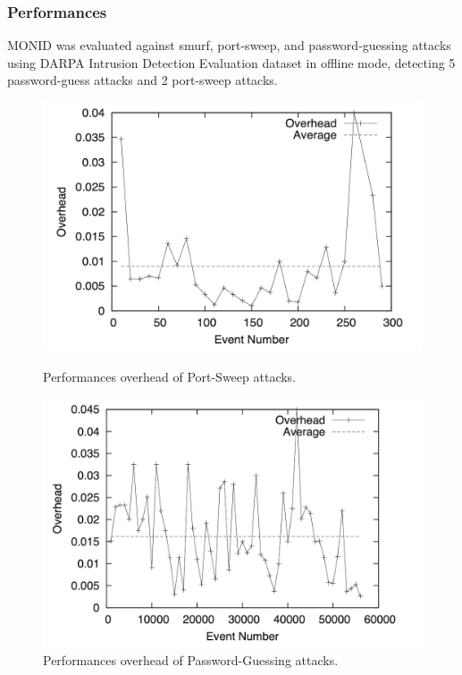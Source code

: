 \documentclass[aspectratio=169,t,xcolor=table]{beamer}
\begin{document}
\begin{frame}
    \frametitle{Performances}
    MONID was evaluated against smurf, port-sweep, and password-guessing attacks using DARPA Intrusion Detection Evaluation dataset in offline mode, detecting 5 password-guess attacks and 2 port-sweep attacks.
    \begin{figure}[!htb]
        \begin{center}
            \begin{minipage}{0.45\textwidth}
                \centering
                \includegraphics[width=\linewidth]{images/graph 1.png}
                \caption{Performances overhead of Port-Sweep attacks.}\label{graph1}
            \end{minipage}
            \hfill
            \begin{minipage}{0.45\textwidth}
                \centering
                \includegraphics[width=\linewidth]{images/graph 2.png}
                \caption{Performances overhead of Password-Guessing attacks.}\label{graph2}
            \end{minipage}
        \end{center}
    \end{figure}

\end{frame}
\end{document}
